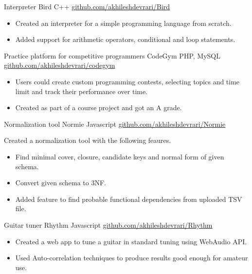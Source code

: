 \documentclass[]{awesome-cv}
\begin{document}
\vspace{-7mm}
\begin{cventries}
	\cventry
	{Interpreter}
	{Bird}
	{C++}
	{\href{https://github.com/akhileshdevrari/Bird}{github.com/akhileshdevrari/Bird}}
	{
		\vspace{-3mm}
		\begin{itemize}
			\item Created an interpreter for a simple programming language from scratch.
			\item Added support for arithmetic operators, conditional and loop statements.
		\end{itemize}		
	}
	
	\vspace{-2mm}
	\cventry
	{Practice platform for competitive programmers}
	{CodeGym}
	{PHP, MySQL}
	{\href{https://github.com/akhileshdevrari/codegym}{github.com/akhileshdevrari/codegym}}
	{
		\vspace{-3mm}
		\begin{itemize}
			\item Users could create custom programming contests, selecting topics and time limit and track their performance over time.
			\item Created as part of a course project and got an A grade.
		\end{itemize}
	}
	
	
	\vspace{-2mm}
	\cventry
	{Normalization tool}
	{Normie}
	{Javascript}
	{\href{https://github.com/akhileshdevrari/Normie}{github.com/akhileshdevrari/Normie}}
	{
		Created a normalization tool with the following feaures.
		\begin{itemize}
			\item Find minimal cover, closure, candidate keys and normal form of given schema.
			\item Convert given schema to 3NF.
			\item Added feature to find probable functional dependencies from uploaded TSV file.
		\end{itemize}
	}
	
	\vspace{-2mm}
	\cventry
	{Guitar tuner}
	{Rhythm}
	{Javascript}
	{\href{https://github.com/akhileshdevrari/Rhythm}{github.com/akhileshdevrari/Rhythm}}
	{
		\vspace{-3mm}
		\begin{itemize}
		\item Created a web app to tune a guitar in standard tuning using WebAudio API.
		\item Used Auto-correlation techniques to produce results good enough for amateur use.
		\end{itemize}	
	}
	
\end{cventries}
\end{document}

